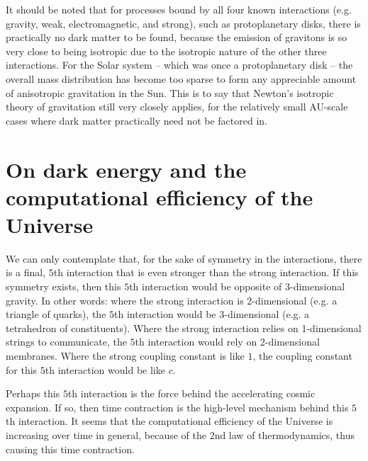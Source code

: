 \documentclass[12pt]{article}
\begin{document}
It should be noted that for processes bound by all four known interactions (e.g. gravity, weak, electromagnetic, and strong), such as protoplanetary disks, there is practically no dark matter to be found, because the emission of gravitons is so very close to being isotropic due to the isotropic nature of the other three interactions.
For the Solar system -- which was once a protoplanetary disk -- the overall mass distribution has become too sparse to form any appreciable amount of anisotropic gravitation in the Sun.
This is to say that Newton's isotropic theory of gravitation still very closely applies, for the relatively small AU-scale cases where dark matter practically need not be factored in.




\section{On dark energy and the computational efficiency of the Universe}

We can only contemplate that, for the sake of symmetry in the interactions, there is a final, $5$th interaction that is even stronger than the strong interaction.
If this symmetry exists, then this $5$th interaction would be opposite of 3-dimensional gravity.
In other words: where the strong interaction is 2-dimensional (e.g. a triangle of quarks), the $5$th interaction would be 3-dimensional (e.g. a tetrahedron of constituents).
Where the strong interaction relies on 1-dimensional strings to communicate, the $5$th interaction would rely on 2-dimensional membranes.
Where the strong coupling constant is like $1$, the coupling constant for this $5$th interaction would be like $c$.


Perhaps this $5$th interaction is the force behind the accelerating cosmic expansion.
If so, then time contraction is the high-level mechanism behind this $5$th interaction.
It seems that the computational efficiency of the Universe is increasing over time in general, because of the $2$nd law of thermodynamics, thus causing this time contraction.




\end{document}
